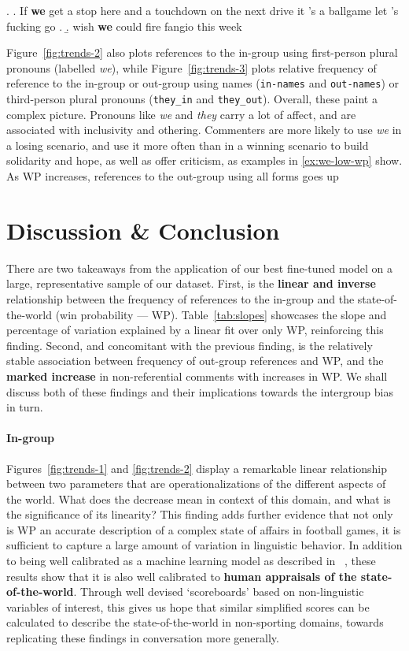 \ex.\label{ex:we-low-wp} \a. If \textbf{we} get a stop here and a touchdown on the next drive it ’s a ballgame let ’s fucking go .
     \b.  wish \textbf{we} could fire fangio this week\textellipsis

Figure~\ref{fig:trends-2} also plots references to the in-group using first-person plural pronouns (labelled \emph{we}), while Figure~\ref{fig:trends-3} plots relative frequency of reference to the in-group or out-group using names (\texttt{in-names} and \texttt{out-names}) or third-person plural pronouns (\texttt{they\_in} and \texttt{they\_out}). Overall, these paint a complex picture. Pronouns like \emph{we} and \emph{they} carry a lot of affect, and are associated with inclusivity and othering. Commenters are more likely to use \emph{we} in a losing scenario, and use it more often than in a winning scenario to build solidarity and hope, as well as offer criticism, as examples in \ref{ex:we-low-wp} show. As WP increases, references to the out-group using all forms goes up 

\section{Discussion \& Conclusion}
\label{sec:football-conclusion}



There are two takeaways from the application of our best fine-tuned model on a large, representative sample of our dataset. First, is the \textbf{linear and inverse} relationship between the frequency of references to the in-group and the state-of-the-world (win probability --- WP). Table~\ref{tab:slopes} showcases the slope and percentage of variation explained by a linear fit over only WP, reinforcing this finding. Second, and concomitant with the previous finding, is the relatively stable association between frequency of out-group references and WP, and the \textbf{marked increase} in non-referential comments with increases in WP. We shall discuss both of these findings and their implications towards the intergroup bias in turn.

\paragraph{In-group} Figures~\ref{fig:trends-1} and \ref{fig:trends-2} display a remarkable linear relationship between two parameters that are operationalizations of the different aspects of the world. What does the decrease mean in context of this domain, and what is the significance of its linearity? This finding adds further evidence that not only is WP an accurate description of a complex state of affairs in football games, it is sufficient to capture a large amount of variation in linguistic behavior. In addition to being well calibrated as a machine learning model as described in ~\citet{baldwin2021nflfastr}, these results show that it is also well calibrated to \textbf{human appraisals of the state-of-the-world}. Through well devised `scoreboards' based on non-linguistic variables of interest, this gives us hope that similar simplified scores can be calculated to describe the state-of-the-world in non-sporting domains, towards replicating these findings in conversation more generally.

